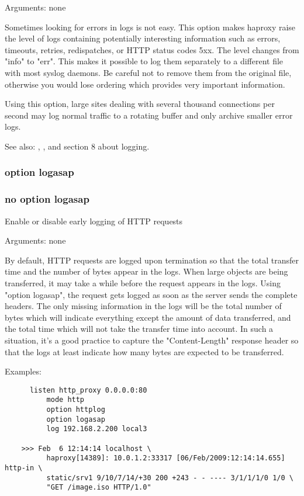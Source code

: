   Arguments: none

  Sometimes looking for errors in logs is not easy. This option makes haproxy
  raise the level of logs containing potentially interesting information such
  as errors, timeouts, retries, redispatches, or HTTP status codes 5xx. The
  level changes from "info" to "err". This makes it possible to log them
  separately to a different file with most syslog daemons. Be careful not to
  remove them from the original file, otherwise you would lose ordering which
  provides very important information.

  Using this option, large sites dealing with several thousand connections per
  second may log normal traffic to a rotating buffer and only archive smaller
  error logs.

  See also: , ,  and section 8 about
             logging.

\subsubsection[option logasap]{option logasap}
\subsubsection[no option logasap]{no option logasap}


  Enable or disable early logging of HTTP requests


  Arguments: none

  By default, HTTP requests are logged upon termination so that the total
  transfer time and the number of bytes appear in the logs. When large objects
  are being transferred, it may take a while before the request appears in the
  logs. Using "option logasap", the request gets logged as soon as the server
  sends the complete headers. The only missing information in the logs will be
  the total number of bytes which will indicate everything except the amount
  of data transferred, and the total time which will not take the transfer
  time into account. In such a situation, it's a good practice to capture the
  "Content-Length" response header so that the logs at least indicate how many
  bytes are expected to be transferred.

  Examples:
\begin{verbatim}
      listen http_proxy 0.0.0.0:80
          mode http
          option httplog
          option logasap
          log 192.168.2.200 local3

    >>> Feb  6 12:14:14 localhost \
          haproxy[14389]: 10.0.1.2:33317 [06/Feb/2009:12:14:14.655] http-in \
          static/srv1 9/10/7/14/+30 200 +243 - - ---- 3/1/1/1/0 1/0 \
          "GET /image.iso HTTP/1.0"
\end{verbatim}

